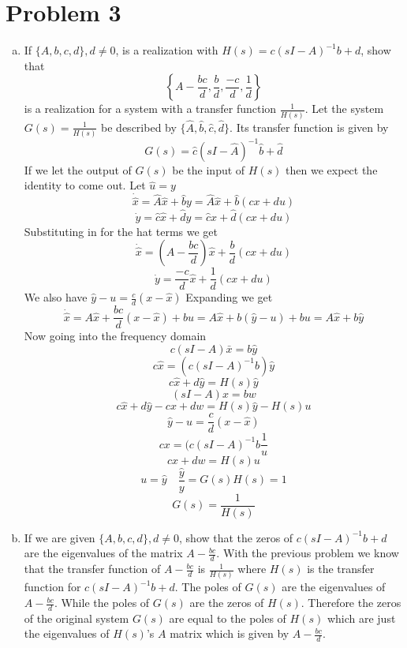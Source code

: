 \documentclass{article}
\begin{document}
\newpage
\section*{Problem 3}
\begin{enumerate}[(a)]
\item If $\{A, b, c, d\}, d \neq 0$, is a realization with $H(s) = c(sI-A)^{-1}b +d$, show that
$$ \left\{ A - \frac{bc}{d}, \frac{b}{d}, \frac{-c}{d}, \frac{1}{d} \right\} $$
is a realization for a system with a transfer function $\frac{1}{H(s)}$.
\newline
\newline
Let the system $G(s) = \frac{1}{H(s)}$ be described by $\{\hat{A}, \hat{b}, \hat{c}, \hat{d}\}$.
Its transfer function is given by
$$
G(s) = \hat{c}(sI-\hat{A})^{-1}\hat{b}+\hat{d}
$$
If we let the output of $G(s)$ be the input of $H(s)$ then we expect the identity to come out.
Let $\hat{u} = y$
$$ \dot{\hat{x}} = \hat{A}\hat{x}+\hat{b}y = \hat{A}\hat{x}+\hat{b}(cx + du) $$
$$ \dot{y} = \hat{c}\hat{x} + \hat{d}y = \hat{c}\hat{x} + \hat{d}(cx + du) $$
Substituting in for the hat terms we get
$$ \dot{\hat{x}} = (A - \frac{bc}{d})\hat{x}+\frac{b}{d}(cx + du) $$
$$ \dot{y} = \frac{-c}{d}\hat{x} + \frac{1}{d}(cx + du) $$
We also have $\hat{y} - u = \frac{c}{d} (x-\hat{x})$
Expanding we get
$$ \dot{\hat{x}} = A\hat{x} + \frac{bc}{d}(x-\hat{x})+bu = A \hat{x} + b(\hat{y}-u) + bu = A\hat{x} + b\hat{y} $$
Now going into the frequency domain
$$c(sI - A)\bar{x} = b\hat{y}$$
$$ c \hat{x} = (c(sI-A)^{-1}b)\hat{y} $$
$$ c\hat{x}+d\hat{y} = H(s)\hat{y} $$
$$(sI-A)x = bw $$
$$c\hat{x} + d\hat{y} - cx + dw = H(s)\hat{y}-H(s)u $$
$$ \hat{y} - u = \frac{c}{d} (x - \hat{x}) $$
$$cx = (c(sI-A)^{-1}b \frac{1}{u} $$
$$cx + dw = H(s) {u} $$
$$ u = \hat{y} \quad \frac{\hat{y}}{y} = G(s)H(s) = 1 $$
$$ G(s) = \frac{1}{H(s)} $$
\item If we are given $\{A, b, c, d\}, d \neq 0$, show that the zeros of $c(sI-A)^{-1}b + d$ are the eigenvalues of the matrix $ A - \frac{bc}{d}$.
\newline
\newline
With the previous problem we know that the transfer function of $A - \frac{bc}{d}$ is $\frac{1}{H(s)}$ where $H(s)$ is the transfer function for $c(sI-A)^{-1}b + d$.
The poles of $G(s)$ are the eigenvalues of $A - \frac{bc}{d}$. While the poles of $G(s)$ are the zeros of $H(s)$.
Therefore the zeros of the original system $G(s)$ are equal to the poles of $H(s)$ which are just the eigenvalues of $H(s)$'s $A$ matrix which is given by $A-\frac{bc}{d}$.

\end{enumerate}
\end{document}
